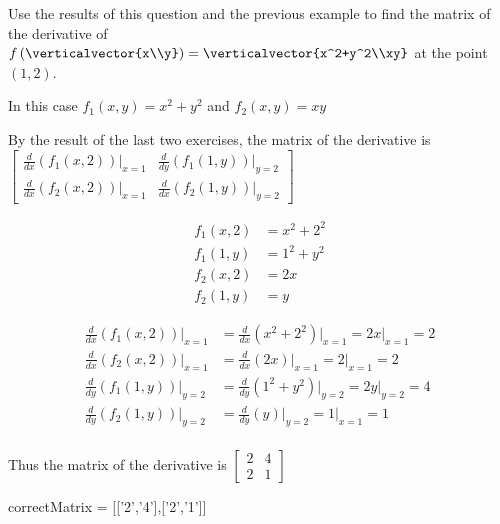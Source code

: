 \documentclass{ximera}
\begin{document}
\begin{question}
	Use the results of this question and the previous example  to find the matrix of the derivative of  $f\left(\verticalvector{x\\y}\right) = \verticalvector{x^2+y^2\\xy}$
	at the point \((1,2)\).
	\begin{solution}
		\begin{hint}
			In this case  $f_1(x,y) = x^2+y^2$ and $f_2(x,y) = xy$
		\end{hint}
		\begin{hint}
			By the result of the last two exercises, the matrix of the derivative is \(\begin{bmatrix} \frac{d}{dx}(f_1(x,2))\big|_{x=1} & \frac{d}{dy}(f_1(1,y))\big|_{y=2}
			\\ \frac{d}{dx}(f_2(x,2))\big|_{x=1} & \frac{d}{dx}(f_2(1,y))\big|_{y=2}\end{bmatrix}\)
		\end{hint}
		\begin{hint}
			\begin{align*}
			f_1(x,2) &= x^2+2^2\\
			  f_1(1,y) &= 1^2+y^2\\
			    f_2(x,2) &= 2x \\
			    f_2(1,y) &= y
			\end{align*}
		\end{hint}
		\begin{hint}
			\begin{align*}	
			\frac{d}{dx}(f_1(x,2))\big|_{x=1} &= \frac{d}{dx} \left( x^2+2^2\right)\big|_{x=1} = 2x\big|_{x=1}=2\\
			\frac{d}{dx}(f_2(x,2))\big|_{x=1} &= \frac{d}{dx} \left( 2x\right)\big|_{x=1} = 2\big|_{x=1}=2\\
			\frac{d}{dy}(f_1(1,y))\big|_{y=2} &= \frac{d}{dy} \left( 1^2+y^2\right)\big|_{y=2} = 2y\big|_{y=2}=4\\
			\frac{d}{dy}(f_2(1,y))\big|_{y=2} &= \frac{d}{dy} \left(y\right)\big|_{y=2} = 1\big|_{x=1}=1\\
			\end{align*}
		\end{hint}
		\begin{hint}
			Thus the matrix of the derivative is \(\begin{bmatrix} 2&4\\2&1 \end{bmatrix}\)
		\end{hint}
		\begin{matrix-answer}
			correctMatrix = [['2','4'],['2','1']]
		\end{matrix-answer}
	\end{solution}
\end{question}
\end{document}
